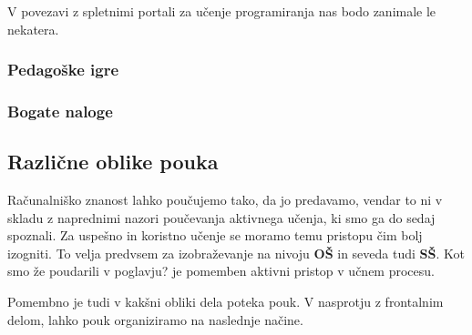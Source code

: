 V povezavi z spletnimi portali za učenje programiranja nas bodo
zanimale le nekatera.

\subsubsection{Pedagoške igre}
\label{sec:pedagoške_igre}

\subsubsection{Bogate naloge}
\label{sec:bogate_naloge}

\subsection{Različne oblike pouka}
\label{sec:različne_oblike_pouka}

Računalniško znanost lahko poučujemo tako, da jo predavamo, vendar to
ni v skladu z naprednimi nazori poučevanja aktivnega učenja, ki smo ga
do sedaj spoznali. Za uspešno in koristno učenje se moramo temu
pristopu čim bolj izogniti. To velja predvsem za izobraževanje na
nivoju \textbf{OŠ} in seveda tudi \textbf{SŠ}. Kot smo že poudarili v
poglavju? je pomemben aktivni pristop v učnem procesu.

Pomembno je tudi v kakšni obliki dela poteka pouk. V nasprotju z
frontalnim delom, lahko pouk organiziramo na naslednje načine.

